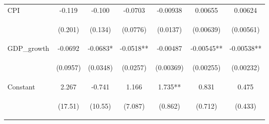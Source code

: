 \documentclass[]{article}
\begin{document}
\begin{center}
\begin{tabular}{lcccccc}
CPI & -0.119 & -0.100 & -0.0703 & -0.00938 & 0.00655 & 0.00624 \\
\vspace{4pt} & \begin{footnotesize}(0.201)\end{footnotesize} & \begin{footnotesize}(0.134)\end{footnotesize} & \begin{footnotesize}(0.0776)\end{footnotesize} & \begin{footnotesize}(0.0137)\end{footnotesize} & \begin{footnotesize}(0.00639)\end{footnotesize} & \begin{footnotesize}(0.00561)\end{footnotesize} \\
GDP\_growth & -0.0692 & -0.0683* & -0.0518** & -0.00487 & -0.00545** & -0.00538** \\
\vspace{4pt} & \begin{footnotesize}(0.0957)\end{footnotesize} & \begin{footnotesize}(0.0348)\end{footnotesize} & \begin{footnotesize}(0.0257)\end{footnotesize} & \begin{footnotesize}(0.00369)\end{footnotesize} & \begin{footnotesize}(0.00255)\end{footnotesize} & \begin{footnotesize}(0.00232)\end{footnotesize} \\
Constant & 2.267 & -0.741 & 1.166 & 1.735** & 0.831 & 0.475 \\
 & \begin{footnotesize}(17.51)\end{footnotesize} & \begin{footnotesize}(10.55)\end{footnotesize} & \begin{footnotesize}(7.087)\end{footnotesize} & \begin{footnotesize}(0.862)\end{footnotesize} & \begin{footnotesize}(0.712)\end{footnotesize} & \begin{footnotesize}(0.433)\end{footnotesize} \\

\end{tabular}
\end{center}
\end{document}

